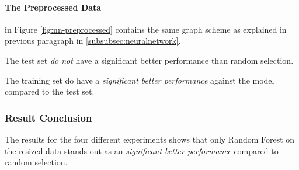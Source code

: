 \paragraph{The Preprocessed Data}
in Figure \ref{fig:nn-preprocessed} contains the same graph scheme as explained in previous paragraph in \ref{subsubsec:neuralnetwork}. 

The test set \emph{do not} have a significant better performance than random selection.

The training set do have a \emph{significant better performance} against the model compared to the test set.

\subsubsection{Result Conclusion}
The results for the four different experiments shows that only Random Forest on the resized data stands out as an \emph{significant better performance} compared to random selection.

\label{subsec:evaluation}